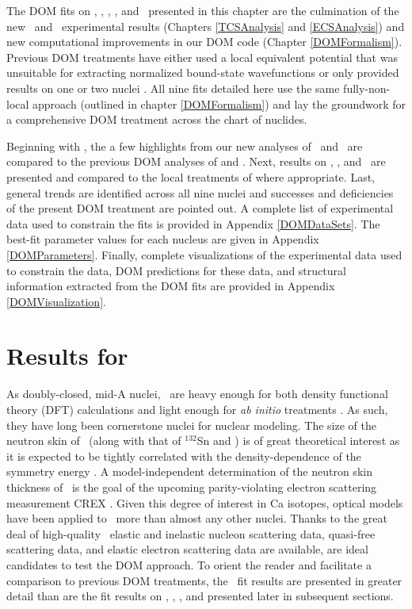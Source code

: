 The \gls{DOM} fits on \oSixEight, \caAughtEight, \niEightFour,
\snTwelveFour, and \pbEight\ presented in
this chapter are the culmination of the new \tot\ and \el\ experimental results
(Chapters \ref{TCSAnalysis} and \ref{ECSAnalysis})
and new computational improvements in our DOM code (Chapter \ref{DOMFormalism}).
Previous DOM treatments have either used a
local equivalent potential \cite{Charity2006, Mueller2011} that was unsuitable for extracting
normalized bound-state wavefunctions or only provided results on one or
two nuclei \cite{Mahzoon2017, Atkinson2018}. All nine fits detailed here use the same fully-non-
local approach
(outlined in chapter \ref{DOMFormalism}) and lay the groundwork for a comprehensive DOM treatment 
across the chart of nuclides.

Beginning with \caForty, the a few highlights from our new analyses of
\caAughtEight\ and \pbEight\ are compared to the previous
DOM analyses of \cite{MahzoonPhDThesis} and 
\cite{Atkinson2018}. Next, results on \oSixEight, \niEightFour, and \snTwelveFour\ are
presented and compared to the local treatments of \cite{Charity2006, Mueller2011} where appropriate. 
Last, general trends are identified across
all nine nuclei and successes and deficiencies of the present DOM treatment are pointed out.
A complete list of experimental data used to constrain the fits is provided in Appendix
\ref{DOMDataSets}. The best-fit parameter values for each nucleus are given in Appendix
\ref{DOMParameters}. Finally, complete visualizations of the experimental data used to constrain
the data, DOM predictions for these data, and structural information extracted from the DOM fits are
provided in Appendix \ref{DOMVisualization}.

\section{Results for \caAughtEight}
As doubly-closed, mid-A nuclei, \caAughtEight\ are heavy enough for both density functional
theory (DFT) calculations \cite{Piekarewicz2012} and light enough for \textit{ab initio} 
treatments \cite{Hagen2016}. As such, they have long been cornerstone nuclei for
nuclear modeling. The size of the neutron skin of \caEight\ (along with that of $^{132}$Sn and
\pbEight) is of great theoretical interest as it is expected to be tightly correlated with the
density-dependence of the symmetry energy \cite{Fattoyev2012}. A model-independent determination
of the neutron skin thickness of \caEight\ is the goal of the upcoming parity-violating
electron scattering measurement CREX \cite{Horowitz2014}. Given this degree of interest in Ca
isotopes, optical models have been applied to
\caAughtEight\ more than almost any other nuclei. Thanks to the
great deal of high-quality \caAughtEight\ 
elastic and inelastic nucleon scattering data, quasi-free scattering data, and elastic electron
scattering data are available, \caAughtEight are ideal
candidates to test the DOM approach. To orient the
reader and facilitate a comparison to previous DOM treatments, the \caAughtEight\ fit results are
presented in greater detail than are the fit results on \oSixEight, \niEightFour,
\snTwelveFour, and \pbEight presented later in subsequent sections.

